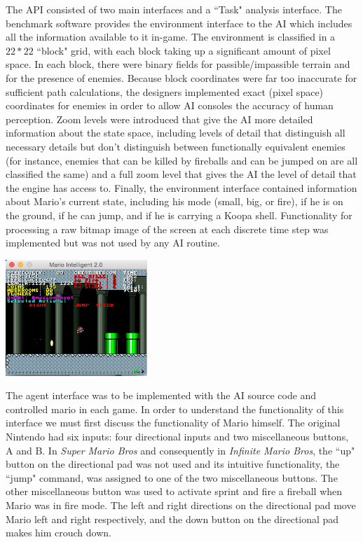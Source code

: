 \documentclass[12pt]{article}
\begin{document}
\begin{multicols}{2}
The API consisted of two main interfaces and a ``Task" analysis interface. The benchmark software provides the environment interface 
to the AI which includes all the information available to it in-game. The environment is classified in a $22 * 22$ ``block" grid, with each block 
taking up a significant amount of pixel space. In each block, there were binary fields for passible/impassible terrain and for the presence of enemies. 
Because block coordinates were far too inaccurate for sufficient path calculations, the designers implemented exact (pixel space) coordinates for 
enemies in order to allow AI consoles the accuracy of human perception. Zoom levels were introduced that give the AI more detailed information about the 
state space, including levels of detail that distinguish all necessary details but don't distinguish between functionally equivalent enemies (for instance, enemies that 
can be killed by fireballs and can be jumped on are all classified the same) and a full zoom level that gives the AI the level of detail that the engine has access to.
Finally, the environment interface contained information about Mario's current state, including his mode (small, big, or fire), if he is on the ground, if he can jump, 
and if he is carrying a Koopa shell. Functionality for processing a raw bitmap image of the screen at each discrete time step was implemented but was not used by any AI routine.

\begingroup
    \centering
    \includegraphics[width=0.4\textwidth]{Small}
\endgroup

The agent interface was to be implemented with the AI source code and controlled mario in each game. In order to understand the functionality of this interface we 
must first discuss the functionality of Mario himself. The original Nintendo had six inputs: four directional inputs and two miscellaneous buttons, A and B. 
In \textit{Super Mario Bros} and consequently in \textit{Infinite Mario Bros}, the ``up" button on the directional pad was not used and its intuitive functionality, 
the ``jump" command, was assigned to one of the two miscellaneous buttons. The other miscellaneous button was used to activate sprint and fire a fireball 
when Mario was in fire mode. The left and right directions on the directional pad move Mario left and right respectively, and the down button on the directional 
pad makes him crouch down. 
\hspace{5mm}
\\


\end{multicols}
\end{document}
